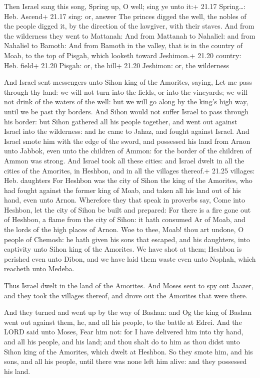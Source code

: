  Then Israel sang this song, Spring up, O well; sing ye
unto it:+ 21.17 Spring\ldots: Heb. Ascend+ 21.17 sing: or, answer
 The princes digged the well, the nobles of the people
digged it, by the direction of the lawgiver, with their staves. And from
the wilderness they went to Mattanah:  And from Mattanah to
Nahaliel: and from Nahaliel to Bamoth:  And from Bamoth in
the valley, that is in the country of Moab, to the top of Pisgah, which
looketh toward Jeshimon.+ 21.20 country: Heb. field+ 21.20 Pisgah: or,
the hill+ 21.20 Jeshimon: or, the wilderness

 And Israel sent messengers unto Sihon king of the
Amorites, saying,  Let me pass through thy land: we will
not turn into the fields, or into the vineyards; we will not drink of
the waters of the well: but we will go along by the king's high way,
until we be past thy borders.  And Sihon would not suffer
Israel to pass through his border: but Sihon gathered all his people
together, and went out against Israel into the wilderness: and he came
to Jahaz, and fought against Israel.  And Israel smote him
with the edge of the sword, and possessed his land from Arnon unto
Jabbok, even unto the children of Ammon: for the border of the children
of Ammon was strong.  And Israel took all these cities: and
Israel dwelt in all the cities of the Amorites, in Heshbon, and in all
the villages thereof.+ 21.25 villages: Heb. daughters  For
Heshbon was the city of Sihon the king of the Amorites, who had fought
against the former king of Moab, and taken all his land out of his hand,
even unto Arnon.  Wherefore they that speak in proverbs
say, Come into Heshbon, let the city of Sihon be built and prepared:
 For there is a fire gone out of Heshbon, a flame from the
city of Sihon: it hath consumed Ar of Moab, and the lords of the high
places of Arnon.  Woe to thee, Moab! thou art undone, O
people of Chemosh: he hath given his sons that escaped, and his
daughters, into captivity unto Sihon king of the Amorites. 
We have shot at them; Heshbon is perished even unto Dibon, and we have
laid them waste even unto Nophah, which reacheth unto Medeba.

 Thus Israel dwelt in the land of the Amorites.
 And Moses sent to spy out Jaazer, and they took the
villages thereof, and drove out the Amorites that were there.

 And they turned and went up by the way of Bashan: and Og
the king of Bashan went out against them, he, and all his people, to the
battle at Edrei.  And the LORD said unto Moses, Fear him
not: for I have delivered him into thy hand, and all his people, and his
land; and thou shalt do to him as thou didst unto Sihon king of the
Amorites, which dwelt at Heshbon.  So they smote him, and
his sons, and all his people, until there was none left him alive: and
they possessed his land.

